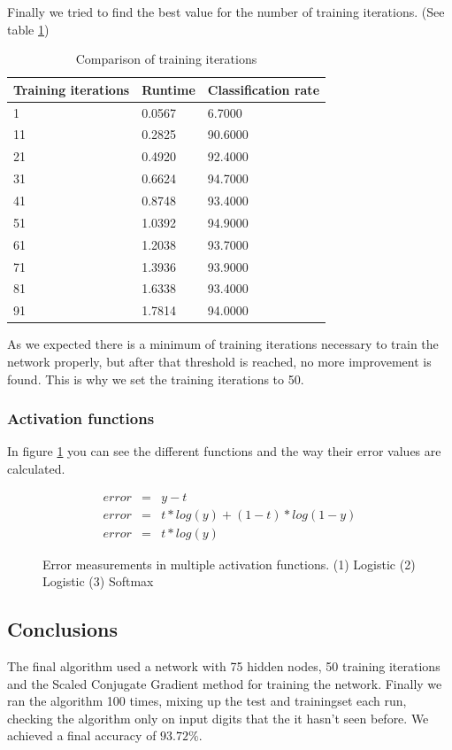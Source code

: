 \documentclass{article}
\begin{document}
\newpage
Finally we tried to find the best value for the number of training iterations. (See table \ref{tab:trainiter})
\begin{table}[H]
	\centering
	\begin{tabular}{| l | l | l |}
		\hline
		Training iterations & Runtime & Classification rate \\ \hline
            1 &   0.0567  &  6.7000 \\ \hline
           11 &   0.2825  & 90.6000 \\ \hline
           21 &   0.4920  & 92.4000 \\ \hline
           31 &   0.6624  & 94.7000 \\ \hline
           41 &   0.8748  & 93.4000 \\ \hline
           51 &   1.0392  & 94.9000 \\ \hline
           61 &   1.2038  & 93.7000 \\ \hline
           71 &   1.3936  & 93.9000 \\ \hline
           81 &   1.6338  & 93.4000 \\ \hline
           91 &   1.7814  & 94.0000 \\ \hline
	\end{tabular}
	\caption{Comparison of training iterations}
	\label{tab:trainiter}
\end{table}

As we expected there is a minimum of training iterations necessary to train the network properly, but after that threshold is reached, no more improvement is found. This is why we set the training iterations to 50.

\subsubsection{Activation functions}
In figure \ref{fig:errormeasure} you can see the different functions and the way their error values are calculated.

\begin{figure}[H]
	\centering
	\begin{eqnarray}
		error & = & y - t \\
		error & = & t * log(y) + (1 - t) * log(1 - y) \\
		error & = & t * log(y)
	\end{eqnarray}
	\caption{Error measurements in multiple activation functions. (1) Logistic (2) Logistic (3) Softmax }
    \label{fig:errormeasure}
\end{figure}

\subsection{Conclusions}
The final algorithm used a network with 75 hidden nodes, 50 training iterations and the Scaled Conjugate Gradient method for training the network. Finally we ran the algorithm 100 times, mixing up the test and trainingset each run, checking the algorithm only on input digits that the it hasn't seen before. We achieved a final accuracy of $93.72\%$.
\end{document}
